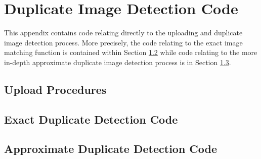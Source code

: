 %
%
  
\chapter{Duplicate Image Detection Code}\label{appa:didcode}
This appendix contains code relating directly to the uploading and duplicate image detection process. More precisely, the code relating to the exact image matching function is contained within Section \ref{appa:exact} while code relating to the more in-depth approximate duplicate image detection process is in Section \ref{appa:approx}.

\section{Upload Procedures}\label{appa:upload}


\section{Exact Duplicate Detection Code}\label{appa:exact}


\section{Approximate Duplicate Detection Code}\label{appa:approx}



